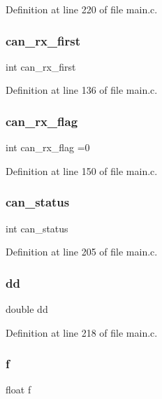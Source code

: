 Definition at line 220 of file main.\+c.

\mbox{\label{main_8c_a27a15a08a688ab41902b678f00976773}} 
\subsubsection{can\+\_\+rx\+\_\+first}
{\footnotesize\ttfamily int can\+\_\+rx\+\_\+first}



Definition at line 136 of file main.\+c.

\mbox{\label{main_8c_a82989d280251163bcee5ffcfbf050969}} 
\subsubsection{can\+\_\+rx\+\_\+flag}
{\footnotesize\ttfamily int can\+\_\+rx\+\_\+flag =0}



Definition at line 150 of file main.\+c.

\mbox{\label{main_8c_a6bffbfe209feb02d13b8eb72cdb3cf4b}} 
\subsubsection{can\+\_\+status}
{\footnotesize\ttfamily int can\+\_\+status}



Definition at line 205 of file main.\+c.

\mbox{\label{main_8c_ac47fb7efa6b9610bdc78116f1f94ec42}} 
\subsubsection{dd}
{\footnotesize\ttfamily double dd}



Definition at line 218 of file main.\+c.

\mbox{\label{main_8c_af900396d7b72ff2a7002e8befe8cf8f1}} 
\subsubsection{f}
{\footnotesize\ttfamily float f}



